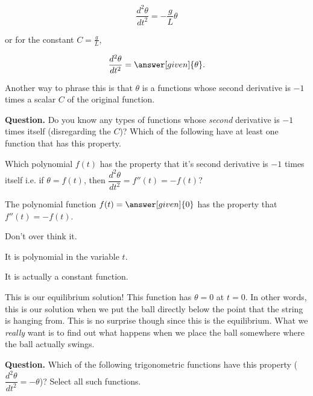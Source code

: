 \documentclass[handout,nooutcomes]{ximera}
\begin{document}
\begin{example}
\begin{explanation}
\[
\dfrac{d^2 \theta}{d t^2}  = -\dfrac{g}{L} \theta
\]

or for the constant $C=\frac{g}{L}$,

\[
\dfrac{d^2 \theta}{d t^2}  = \answer[given]{\theta}.
\]

Another way to phrase this is that $\theta$ is a functions whose
second derivative is $-1$ times a scalar $C$ of the original function.


\textbf{Question.}  Do you know any types of functions whose \emph{second} derivative
is $-1$ times itself (disregarding the $C$)? Which of the following have at least one function that has this property.

\begin{selectAll}
\end{selectAll}


\begin{problem}
Which polynomial $f(t)$ has the property that it's second
derivative is $-1$ times itself i.e. if
$\theta=f(t)$, then $\dfrac{d^2 \theta}{d t^2} = f''(t) = -f(t)$?


The polynomial function $f(t) = \answer[given]{0}$ has the property that $f''(t) = -f(t)$.

\begin{hint}
Don't over think it.
\end{hint}
\begin{hint}
It is polynomial in the variable $t$.
\end{hint}
\begin{hint}
It is actually a constant function.
\end{hint}
\end{problem}

This is our equilibrium solution! This function has $\theta=0$ at $t=0$. In other
words, this is our solution when we put the ball directly below the point
that the string is hanging from. This is no surprise though since this
is the equilibrium. What we \emph{really} want is to find out what happens
when we place the ball somewhere where the ball actually swings.


\textbf{Question.}  Which of the following trigonometric functions have this property
($\dfrac{d^2 \theta}{d t^2} = -\theta$)? Select all such functions.
\begin{selectAll}
\end{selectAll}



\end{explanation}
\end{example}
\end{document}
